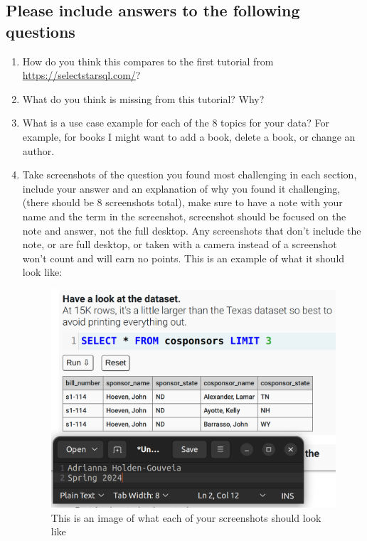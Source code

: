 \documentclass[12pt]{article}
\begin{document}
\subsection*{Please include answers to the following questions}
    \begin{enumerate}
        \item How do you think this compares to the first tutorial from  \url{https://selectstarsql.com/}?
        \item What do you think is missing from this tutorial? Why?
        \item What is a use case example for each of the 8 topics for your data?  For example, for books I might want to add a book, delete a book, or change an author.  
        \item Take screenshots of the question  you found most challenging in each section, include your answer and an explanation of why you found it challenging, (there should be 8 screenshots total), make sure to have a note with your name and the term in the screenshot, screenshot should be focused on the note and answer, not the full desktop.  Any screenshots that don't include the note, or are full desktop, or taken with a camera instead of a screenshot won't count and will earn no points. This is an example of what it should look like:        
 
        \begin{figure}[h!]
            \centerline{\includegraphics[scale=.2]{Examplewk6.png}}
            \caption{This is an image of what each of your screenshots should look like}

            \end{figure} 
    \end{enumerate}
\end{document}
